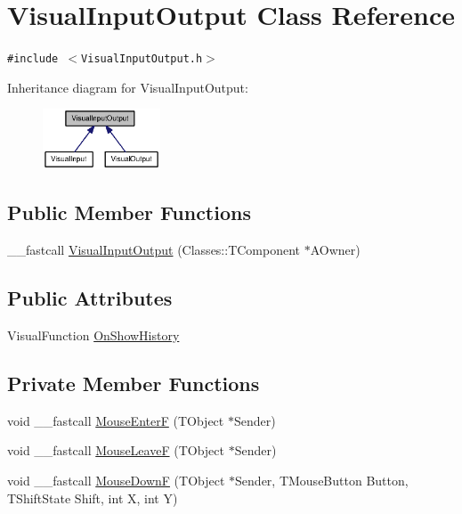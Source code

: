\hypertarget{classVisualInputOutput}{
\section{VisualInputOutput Class Reference}
\label{classVisualInputOutput}
}
{\tt \#include $<$VisualInputOutput.h$>$}

Inheritance diagram for VisualInputOutput:\nopagebreak
\begin{figure}[H]
\begin{center}
\leavevmode
\includegraphics[width=99pt]{classVisualInputOutput__inherit__graph}
\end{center}
\end{figure}
\subsection*{Public Member Functions}
\begin{CompactItemize}
\item 
\_\-\_\-fastcall \hyperlink{classVisualInputOutput_0bd9a6f7a998c00f8bd5caf6e741cc80}{VisualInputOutput} (Classes::TComponent $\ast$AOwner)
\end{CompactItemize}
\subsection*{Public Attributes}
\begin{CompactItemize}
\item 
VisualFunction \hyperlink{classVisualInputOutput_b2f2b186575d7e87de055b36ce867c77}{OnShowHistory}
\end{CompactItemize}
\subsection*{Private Member Functions}
\begin{CompactItemize}
\item 
void \_\-\_\-fastcall \hyperlink{classVisualInputOutput_8821c8e38a799b89c34ec72274803090}{MouseEnterF} (TObject $\ast$Sender)
\item 
void \_\-\_\-fastcall \hyperlink{classVisualInputOutput_d92af8dbf5d8a282a9c3459415f3363d}{MouseLeaveF} (TObject $\ast$Sender)
\item 
void \_\-\_\-fastcall \hyperlink{classVisualInputOutput_e6c46a78d42ac09e36cff16974323573}{MouseDownF} (TObject $\ast$Sender, TMouseButton Button, TShiftState Shift, int X, int Y)
\end{CompactItemize}



